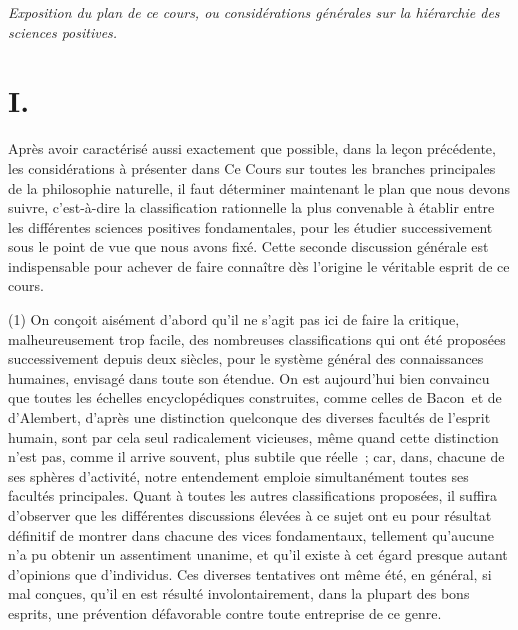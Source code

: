 \documentclass[french,twoside]{book} %
\newcommand\chaptercont{} %
\begin{document}
\begin{center}\emph{Exposition du plan de ce cours, ou considérations générales sur la hiérarchie des sciences positives.}\end{center}

\chaptercont
\section[{I.}]{I.}
\noindent Après avoir caractérisé aussi exactement que possible, dans la leçon précédente, les considérations à présenter dans Ce Cours sur toutes les branches principales de la philosophie naturelle, il faut déterminer maintenant le plan que nous devons suivre, c’est-à-dire la classification rationnelle la plus convenable à établir entre les différentes sciences positives fondamentales, pour les étudier successivement sous le point de vue que nous avons fixé. Cette seconde discussion générale est indispensable pour achever de faire connaître dès l’origine le véritable esprit de ce cours.\par
(1) On conçoit aisément d’abord qu’il ne s’agit pas ici de faire la critique, malheureusement trop facile, des nombreuses classifications qui ont été proposées successivement depuis deux siècles, pour le système général des connaissances humaines, envisagé dans toute son étendue. On est aujourd’hui bien convaincu que toutes les échelles encyclopédiques construites, comme celles de Bacon et de d’Alembert, d’après une distinction quelconque des diverses facultés de l’esprit humain, sont par cela seul radicalement vicieuses, même quand cette distinction n’est pas, comme il arrive souvent, plus subtile que réelle ; car, dans, chacune de ses sphères d’activité, notre entendement emploie simultanément toutes ses facultés principales. Quant à toutes les autres classifications proposées, il suffira d’observer que les différentes discussions élevées à ce sujet ont eu pour résultat définitif de montrer dans chacune des vices fondamentaux, tellement qu’aucune n’a pu obtenir un assentiment unanime, et qu’il existe à cet égard presque autant d’opinions que d’individus. Ces diverses tentatives ont même été, en général, si mal conçues, qu’il en est résulté involontairement, dans la plupart des bons esprits, une prévention défavorable contre toute entreprise de ce genre.\par
\end{document}
